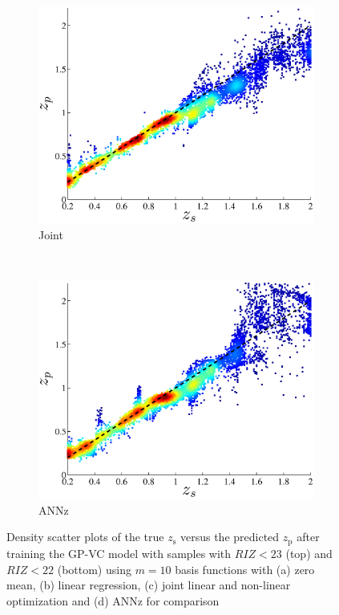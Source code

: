 \documentclass[useAMS,usenatbib,fleqn]{mn2e}
\begin{document}
\begin{figure}
\begin{subfigure}[b]{0.24\textwidth}
                \includegraphics[width=\textwidth]{figures/22_J.eps}
                \caption{Joint}
        \end{subfigure}
       ~
        \begin{subfigure}[b]{0.24\textwidth}
                \includegraphics[width=\textwidth]{figures/ANN_22.eps}
                \caption{ANNz}
        \end{subfigure}
        
        \caption{Density scatter plots of the true $z_\textrm{s}$ versus the predicted $z_\textrm{p}$ after training the GP-VC model with samples with $RIZ<23$ (top) and $RIZ<22$ (bottom) using $m=10$ basis functions with (a) zero mean, (b) linear regression, (c) joint linear and non-linear optimization and (d) ANNz for comparison}
        \label{fig-RIZ-splits}
\end{figure}
\end{document}
